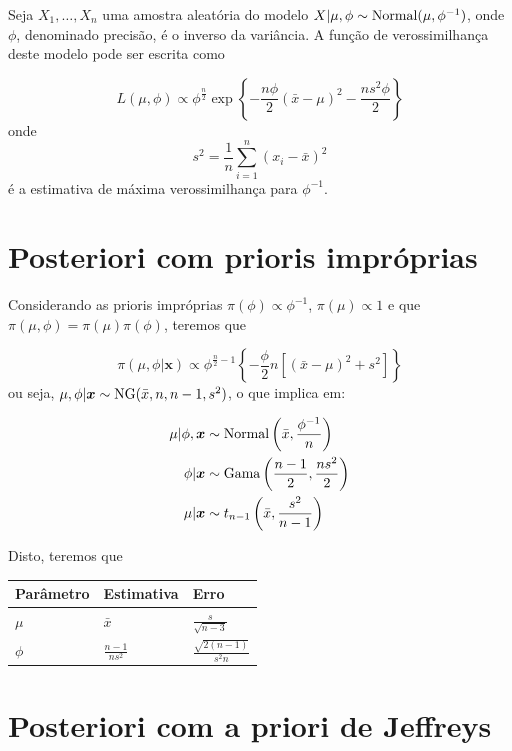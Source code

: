 \documentclass[
  letterpaper,
  DIV=11,
  numbers=noendperiod]{scrreprt}
\theoremstyle{definition}
\theoremstyle{plain}
\theoremstyle{definition}
\theoremstyle{remark}
\begin{document}
Seja \(X_1,\ldots,X_n\) uma amostra aleatória do modelo
\(X|\mu,\phi\sim\hbox{Normal}(\mu,\phi^{-1})\), onde \(\phi\),
denominado precisão, é o inverso da variância. A função de
verossimilhança deste modelo pode ser escrita como

\[L(\mu,\phi)\propto \phi^{\frac{n}{2}}\exp\left\{-\frac{n\phi}{2}(\bar{x}-\mu)^2 -\frac{ns^2\phi}{2}\right\}\]
onde \[s^2=\frac{1}{n}\sum_{i=1}^n(x_i-\bar{x})^2\] é a estimativa de
máxima verossimilhança para \(\phi^{-1}\).

\section{Posteriori com prioris
impróprias}\label{posteriori-com-prioris-impruxf3prias}

Considerando as prioris impróprias \(\pi(\phi)\propto \phi^{-1}\),
\(\pi(\mu)\propto 1\) e que \(\pi(\mu,\phi)=\pi(\mu)\pi(\phi)\), teremos
que

\[\pi(\mu,\phi|\boldsymbol{x})\propto \phi^{\frac{n}{2}-1}\left\{-\frac{\phi}{2}n\left[ (\bar{x}-\mu)^2 +s^2\right]\right\}\]
ou seja, \(\mu,\phi|\boldsymbol{x}\sim\hbox{NG}(\bar{x},n,n-1,s^2)\), o
que implica em:

\[\begin{align}
\mu|\phi,\boldsymbol{x}&\sim\hbox{Normal}\left(\bar{x},\frac{\phi^{-1}}{n}\right)\\
\phi|\boldsymbol{x}&\sim\hbox{Gama}\left(\frac{n-1}{2},\frac{ns^2}{2}\right)\\
\mu|\boldsymbol{x}&\sim t_{n-1}\left(\bar{x},\frac{s^2}{n-1}\right)
\end{align}\]

Disto, teremos que

\begin{longtable}[]{@{}lll@{}}
\toprule\noalign{}
Parâmetro & Estimativa & Erro \\
\midrule\noalign{}
\endhead
\bottomrule\noalign{}
\endlastfoot
\(\mu\) & \(\bar{x}\) & \(\frac{s}{\sqrt{n-3}}\) \\
\(\phi\) & \(\frac{n-1}{ns^2}\) & \(\frac{\sqrt{2(n-1)}}{s^2n}\) \\
\end{longtable}

\section{Posteriori com a priori de
Jeffreys}\label{posteriori-com-a-priori-de-jeffreys}
\end{document}
